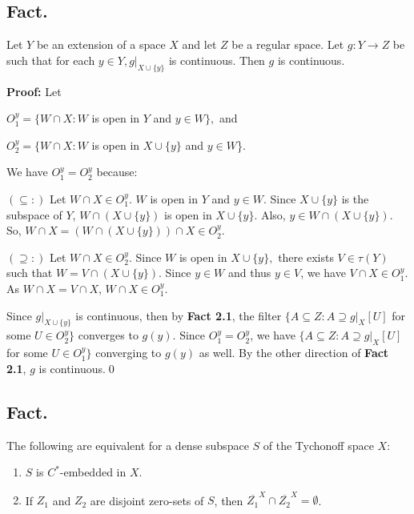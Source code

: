 \documentclass{article}
\begin{document}
\subsection{Fact.} Let $Y$ be an extension of a space $X$ and let $Z$ be a regular space. Let $g:Y\rightarrow Z$ be such that for each $y\in Y, g|_{X\cup \{y\}}$ is continuous. Then $g$ is continuous.

\vskip 15pt

\textbf{Proof: } Let 
\begin{center}
$O_1^y=\{W\cap X: W$ is open in $Y$ and $y\in W\},$ and 

$O_2^y=\{W\cap X: W$ is open in $X\cup \{y\}$ and $y\in W$\}. 
\end{center}


We have $O_1^y=O_2^y$ because: 

\vskip 5pt
$(\subseteq:) $ Let $W\cap X \in O_1^y$. $W$ is open in $Y$ and $y\in W.$ Since $X\cup \{y\}$ is the subspace of $Y$, $W\cap (X\cup \{y\})$ is open in $X\cup \{y\}$. Also, $y\in W\cap (X\cup \{y\}).$ So, $W\cap X=\left(W\cap \left(X\cup\{y\}\right)\right)\cap X \in O_2^y$.


$(\supseteq:)$ Let $W\cap X\in O_2^y$. Since $W$ is open in $X\cup \{y\},$ there exists $V\in \tau(Y)$ such that $W=V\cap (X\cup \{y\})$. Since $y\in W$ and thus $y\in V$, we have $V\cap X \in O_1^y$. As $W\cap X=V\cap X$, $W\cap X \in O_1^y$. 


\vskip 20pt

Since $g|_{X\cup \{y\}}$ is continuous, then by \textbf{Fact 2.1}, the filter $\{A\subseteq Z: A \supseteq g|_X [U]$ for some $U\in O_2^y\}$ converges
 to $g(y)$. Since $O_1^y=O_2^y$, we have $\{A\subseteq Z: A\supseteq g|_X [U]$ for some $U\in O_1^y\}$ converging to $g(y)$ as well. By the other direction of \textbf{Fact 2.1}, $g$ is continuous.\qed













\vskip 40pt












\subsection{Fact.} The following are equivalent for a dense subspace $S$ of the Tychonoff space $X$: 
\begin{enumerate}
	\item $S$ is $C^*$-embedded in $X$. 
	\item If $Z_1$ and $Z_2$ are disjoint zero-sets of $S$, then $\overline{Z_1}^X\cap \overline{Z_2}^X=\emptyset$.
\end{enumerate}
\end{document}

